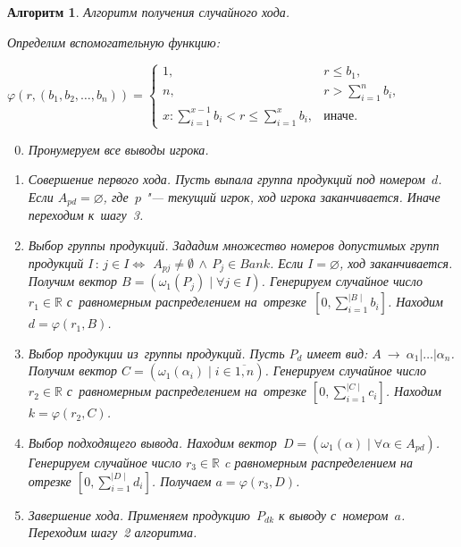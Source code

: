 \documentclass{csmathnotes}
\newtheorem{algoritm}{Алгоритм}
\newcommand{\R}{\mathbb{R}}
\begin{document}
\begin{algoritm}
	\label{randomalgoritm}
	Алгоритм получения случайного хода.
	
	Определим вспомогательную функцию:
	
	\begin{center}
		\begin{math} 
			\varphi(r,(b_1,b_2,\ldots,b_n)) = \begin{cases}
				1, & r\leqslant b_1,\\
				n, & r>\sum_{i=1}^n b_i,\\
				x : \sum_{i=1}^{x-1}b_i < r \leqslant \sum_{i=1}^{x}b_i, & \text{иначе}.
			\end{cases}
		\end{math}
	\end{center}
	
	\begin{enumerate}
		\setcounter{enumi}{-1} 
		\item Пронумеруем все выводы игрока.
		\item Совершение первого хода. Пусть выпала группа продукций под номером~$d$. Если $A_{pd} = \varnothing$, где~$p$ "--- текущий игрок, ход игрока заканчивается. Иначе переходим к~шагу~3.
		\item Выбор группы продукций. Зададим множество номеров допустимых групп продукций $I\,:\,j\in I \Longleftrightarrow$ $A_{pj} \neq \emptyset\,\wedge\,P_j \in Bank$. Если $I = \varnothing$, ход заканчивается. Получим вектор $B = (\omega_1(P_{j}) \mid \forall j \in I )$. Генерируем случайное число $r_1\in\R$ с~равномерным распределением на~отрезке~$\left[0,\sum_{i=1}^{\mid B\mid}b_i\right]$. Находим $d=\varphi(r_1,B)$.
		\item Выбор продукции из~группы продукций. Пусть $P_d$ имеет вид: $A~\rightarrow~\alpha_1|\ldots|\alpha_n$. Получим вектор $C=(\omega_1(\alpha_i) \mid i\in\overline{1,n})$. Генерируем случайное число $r_2\in\R$ с~равномерным распределением на~отрезке $\left[0,\sum_{i=1}^{\mid C\mid}c_i\right]$. Находим $k=\varphi(r_2,C)$.
		\item Выбор подходящего вывода. Находим вектор~$D = (\omega_1(\alpha) \mid \forall \alpha\in A_{pd})$. Генерируем случайное число $r_3\in\R$ c равномерным распределением на отрезке $\left[0,\sum_{i=1}^{\mid D\mid}d_i\right]$. Получаем $a=\varphi(r_3,D)$.
		\item Завершение хода. Применяем продукцию~$P_{dk}$ к выводу с~номером~$a$. Переходим шагу~2 алгоритма.
	\end{enumerate}
\end{algoritm}
\end{document}

